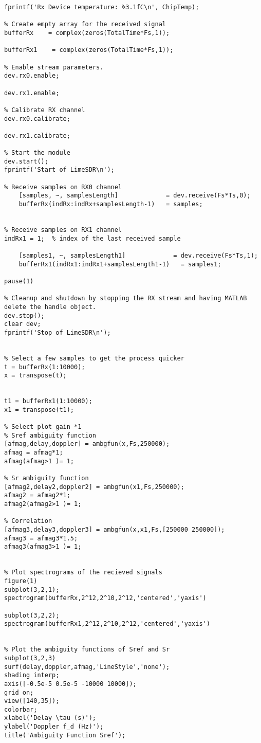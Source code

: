 \begin{verbatim}
fprintf('Rx Device temperature: %3.1fC\n', ChipTemp);

% Create empty array for the received signal
bufferRx    = complex(zeros(TotalTime*Fs,1));

bufferRx1    = complex(zeros(TotalTime*Fs,1));

% Enable stream parameters. 
dev.rx0.enable;

dev.rx1.enable;

% Calibrate RX channel
dev.rx0.calibrate;

dev.rx1.calibrate;

% Start the module
dev.start();
fprintf('Start of LimeSDR\n');

% Receive samples on RX0 channel
    [samples, ~, samplesLength]             = dev.receive(Fs*Ts,0);
    bufferRx(indRx:indRx+samplesLength-1)   = samples;


% Receive samples on RX1 channel
indRx1 = 1;  % index of the last received sample

    [samples1, ~, samplesLength1]             = dev.receive(Fs*Ts,1);
    bufferRx1(indRx1:indRx1+samplesLength1-1)   = samples1;

pause(1)

% Cleanup and shutdown by stopping the RX stream and having MATLAB delete the handle object.
dev.stop();
clear dev;
fprintf('Stop of LimeSDR\n');


% Select a few samples to get the process quicker
t = bufferRx(1:10000);
x = transpose(t);


t1 = bufferRx1(1:10000);
x1 = transpose(t1);

% Select plot gain *1
% Sref ambiguity function
[afmag,delay,doppler] = ambgfun(x,Fs,250000);
afmag = afmag*1;
afmag(afmag>1 )= 1;

% Sr ambiguity function
[afmag2,delay2,doppler2] = ambgfun(x1,Fs,250000);
afmag2 = afmag2*1;
afmag2(afmag2>1 )= 1;

% Correlation
[afmag3,delay3,doppler3] = ambgfun(x,x1,Fs,[250000 250000]);
afmag3 = afmag3*1.5;
afmag3(afmag3>1 )= 1;


% Plot spectrograms of the recieved signals
figure(1)
subplot(3,2,1);
spectrogram(bufferRx,2^12,2^10,2^12,'centered','yaxis')

subplot(3,2,2);
spectrogram(bufferRx1,2^12,2^10,2^12,'centered','yaxis')


% Plot the ambiguity functions of Sref and Sr
subplot(3,2,3)
surf(delay,doppler,afmag,'LineStyle','none'); 
shading interp;
axis([-0.5e-5 0.5e-5 -10000 10000]); 
grid on; 
view([140,35]); 
colorbar;
xlabel('Delay \tau (s)');
ylabel('Doppler f_d (Hz)');
title('Ambiguity Function Sref');



\end{verbatim}
